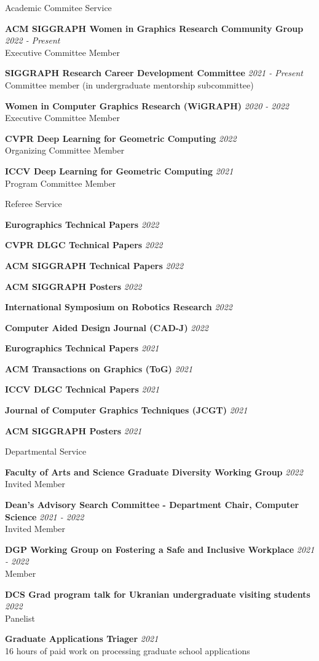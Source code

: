 \documentclass{resume}
\newcommand{\cvitem}[3]{
    {\bf #1} \hfill {\em \small #2} \\ 
    {\small#3 }
}
\newcommand{\cvitemtiny}[2]{
    {\bf #1} \hfill {\em \small #2}
}
\begin{document}
\begin{rSection}{Academic Commitee Service}

\cvitem{ACM SIGGRAPH Women in Graphics Research Community Group}{2022 - Present}{Executive Committee Member}

\cvitem{SIGGRAPH Research Career Development Committee}{2021 - Present}{Committee member (in undergraduate mentorship subcommittee)}

\cvitem{Women in Computer Graphics Research (WiGRAPH)}{2020 - 2022}{Executive Committee Member}

\cvitem{CVPR Deep Learning for Geometric Computing}{2022}{Organizing Committee Member}

\cvitem{ICCV Deep Learning for Geometric Computing}{2021}{Program Committee Member}

\end{rSection}

\begin{rSection}{Referee Service}

\cvitemtiny{Eurographics Technical Papers}{2022}

\cvitemtiny{CVPR DLGC Technical Papers}{2022}

\cvitemtiny{ACM SIGGRAPH Technical Papers}{2022}

\cvitemtiny{ACM SIGGRAPH Posters}{2022}

\cvitemtiny{International Symposium on Robotics Research}{2022}

\cvitemtiny{Computer Aided Design Journal (CAD-J)}{2022}

\cvitemtiny{Eurographics Technical Papers}{2021}

\cvitemtiny{ACM Transactions on Graphics (ToG)}{2021}

\cvitemtiny{ICCV DLGC Technical Papers}{2021}

\cvitemtiny{Journal of Computer Graphics Techniques (JCGT)}{2021}

\cvitemtiny{ACM SIGGRAPH Posters}{2021}

\end{rSection}

\begin{rSection}{Departmental Service}

    
\cvitem{Faculty of Arts and Science Graduate Diversity Working Group}{2022}{Invited Member}

\cvitem{Dean's Advisory Search Committee -  Department Chair, Computer Science}{2021 - 2022}{Invited Member}

\cvitem{DGP Working Group on Fostering a Safe and Inclusive Workplace}{2021 - 2022}{Member}

\cvitem{DCS Grad program talk for Ukranian undergraduate visiting students}{2022}{Panelist}

\cvitem{Graduate Applications Triager}{2021}{16 hours of paid work on processing graduate school applications}




\end{rSection}
\end{document}
